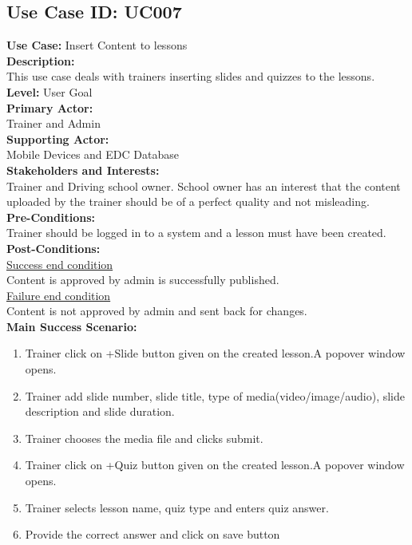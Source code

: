 \documentclass{report}
\begin{document}
\subsection{\textbf{Use Case ID:} UC007}
\textbf{Use Case:} Insert Content to lessons\\[0.3cm]
\textbf{Description:}\\
This use case deals with trainers inserting slides and quizzes to the lessons.\\[0.3cm]
\textbf{Level:} User Goal\\[0.3cm]
\textbf{Primary Actor:}\\
Trainer and Admin\\[0.3cm]
\textbf{Supporting Actor:}\\
Mobile Devices and EDC Database\\[0.3cm]
\textbf{Stakeholders and Interests:}\\
Trainer and Driving school owner. School owner has an interest that the content uploaded by the trainer should be of a perfect quality and not misleading.\\[0.3cm]
\textbf{Pre-Conditions:}\\
Trainer should be logged in to a system and a lesson must have been created.\\[0.3cm]
\textbf{Post-Conditions:}\\
\underline{Success end condition}\\
Content is approved by admin is successfully published.\\[0.3cm]
\underline{Failure end condition}\\
Content is not approved by admin and sent back for changes.\\[0.3cm]
\textbf{\large {Main Success Scenario:}}
\begin{enumerate}
    \item Trainer click on +Slide button given on the created lesson.A popover window opens.
    \item Trainer add slide number, slide title, type of media(video/image/audio), slide description and slide duration.
    \item Trainer chooses the media file and clicks submit.
    \item Trainer click on +Quiz button given on the created lesson.A popover window opens.
    \item Trainer selects lesson name, quiz type and enters quiz answer.
    \item Provide the correct answer and click on save button 
\end{enumerate}
\end{document}
